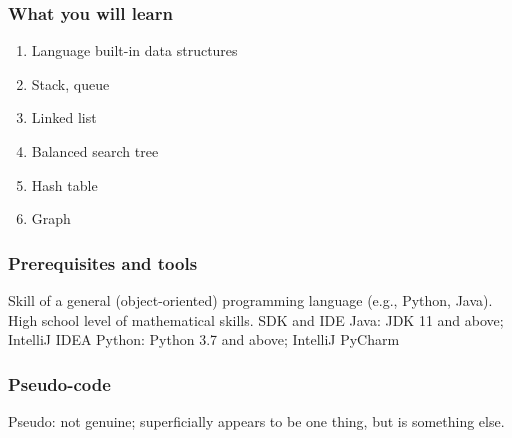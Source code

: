 \documentclass[aspectratio=169, 14pt]{beamer}
\begin{document}
\begin{frame}
    \frametitle{What you will learn}
    \begin{enumerate}
        \item Language built-in data structures
        \item Stack, queue
        \item Linked list
        \item Balanced search tree
        \item Hash table
        \item Graph
    \end{enumerate}
\end{frame}

\begin{frame}
    \frametitle{Prerequisites and tools}
    \begin{outline}
        \1 Skill of a general (\alert{object-oriented}) programming language (e.g., Python, Java).
        \1 High school level of mathematical skills.
        \1 SDK and IDE
            \2 Java: JDK 11 and above; IntelliJ IDEA 
            \2 Python: Python 3.7 and above; IntelliJ PyCharm
    \end{outline}
\end{frame}

\begin{frame}[fragile]
    \frametitle{Pseudo-code}
    Pseudo: not genuine; superficially appears to be one thing, but is something else. 

\end{frame}
\end{document}
